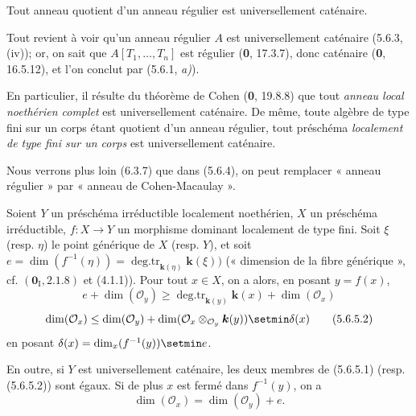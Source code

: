 \begin{proposition}[5.6.4]
\label{IV.2.s5.6.4-fr}
Tout anneau quotient d'un anneau régulier est universellement caténaire.
\end{proposition}

Tout revient à voir qu'un anneau régulier $A$ est universellement caténaire
(5.6.3, (iv)); or, on sait que $A[T_1,\ldots,T_n]$ est régulier (\textbf{0}, 17.3.7),
donc caténaire (\textbf{0}, 16.5.12), et l'on conclut par (5.6.1, \emph{a)}).

En particulier, il résulte du théorème de Cohen (\textbf{0}, 19.8.8) que tout \emph{anneau
local noethérien complet} est universellement caténaire. De même, toute
algèbre de type fini sur un corps étant quotient d'un anneau régulier, tout
préschéma \emph{localement de type fini sur un corps} est universellement caténaire.

Nous verrons plus loin (6.3.7) que dans (5.6.4), on peut remplacer « anneau
régulier » par « anneau de Cohen-Macaulay ».

\begin{proposition}[5.6.5]
Soient $Y$ un préschéma irréductible localement noethérien, $X$ un préschéma
irréductible, $f:X\to Y$ un morphisme dominant localement de type fini. Soit
$\xi$ \textup{(resp. $\eta$)} le point générique de $X$ \textup{(resp. $Y$)}, et soit
$e=\dim(f^{-1}(\eta))=\operatorname{deg.tr}_{\mathbf{k}(\eta)}\boldsymbol{k}(\xi))$
\textup{(« dimension de la fibre générique », cf. $(\mathbf{0}_{\mathrm I},2.1.8)$ et
(4.1.1))}. Pour tout $x\in X$, on a alors, en posant $y=f(x)$,
\begin{equation}
e+\dim(\mathcal O_y)
\geq\operatorname{deg.tr}_{\mathbf{k}(y)}\boldsymbol{k}(x)+\dim(\mathcal O_x)
\tag{5.6.5.1}\label{IV.2.s5.6.5.1-fr}
\end{equation}
\begin{equation}
\dim(\mathcal O_x)
\leq\dim(\mathcal O_y)
+\dim(\mathcal O_x\otimes_{\mathcal O_y}\boldsymbol{k}(y))\setmin\delta(x)
\tag{5.6.5.2}\label{IV.2.s5.6.5.2-fr}
\end{equation}
en posant $\delta(x)=\dim_x(f^{-1}(y))\setmin e$.

En outre, si $Y$ est universellement caténaire, les deux membres de
\textup{(5.6.5.1) (resp. (5.6.5.2))} sont égaux. Si de plus $x$ est fermé dans
$f^{-1}(y)$, on a
\begin{equation}
\dim(\mathcal O_x)=\dim(\mathcal O_y)+e.
\tag{5.6.5.3}\label{IV.2.s5.6.5.3-fr}
\end{equation}
\end{proposition}

